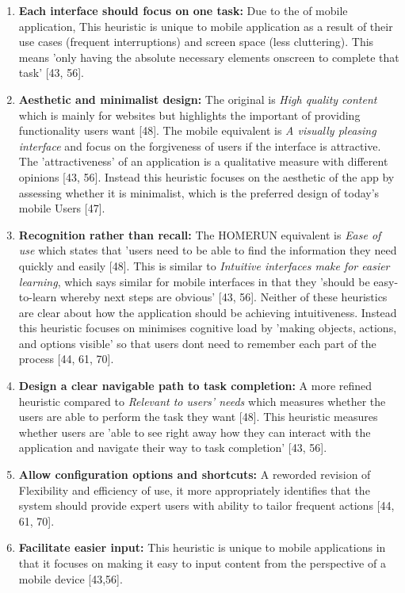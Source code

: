 \documentclass[a4 paper, 12pt]{article}
\begin{document}
\begin{enumerate}
            \item \textbf{\textcolor{mygreen}{Each interface should focus on one task:}} Due to the  of mobile application, This heuristic is unique to mobile application as a result of their use cases (frequent interruptions) and screen space (less cluttering). This means 'only having the absolute necessary elements onscreen to complete that task' [43, 56].            
            \item \textbf{\textcolor{myblue}{Aesthetic and minimalist design:}} The original is \textit{\textcolor{myorange}{High quality content}} which is mainly for websites but highlights the important of providing functionality users want [48]. The mobile equivalent is \textit{\textcolor{mygreen}{A visually pleasing interface}} and focus on the forgiveness of users if the interface is attractive. The 'attractiveness' of an application is a qualitative measure with different opinions [43, 56]. Instead this heuristic focuses on the aesthetic of the app by assessing whether it is minimalist, which is the preferred design of today's mobile Users [47].       
            \item \textbf{\textcolor{myblue}{Recognition rather than recall:}} The HOMERUN equivalent is \textit{\textcolor{myorange}{Ease of use}} which states that 'users need to be able to find the information they need quickly and easily [48]. This is similar to \textit{\textcolor{mygreen}{Intuitive interfaces make for easier learning}}, which says similar for mobile interfaces in that they 'should be easy-to-learn whereby next steps are obvious' [43, 56]. Neither of these heuristics are clear about how the application should be achieving intuitiveness. Instead this heuristic focuses on minimises cognitive load by 'making objects, actions, and options visible' so that users dont need to remember each part of the process [44, 61, 70].
            \item \textbf{\textcolor{mygreen}{Design a clear navigable path to task completion:}} A more refined heuristic compared to \textit{\textcolor{myorange}{Relevant to users’ needs}} which measures whether the users are able to perform the task they want [48]. This heuristic measures whether users are 'able to see right away how they can interact with the application and navigate their way to task completion' [43, 56].     
            \item \textbf{\textcolor{mygreen}{Allow configuration options and shortcuts:}} A reworded revision of \textcolor{myblue}{Flexibility and efficiency of use}, it more appropriately identifies that the system should provide expert users with ability to tailor frequent actions [44, 61, 70]. 
            \item \textbf{\textcolor{mygreen}{Facilitate easier input:}} This heuristic is unique to mobile applications in that it focuses on making it easy to input content from the perspective of a mobile device [43,56]. 
        \end{enumerate}
\end{document}
